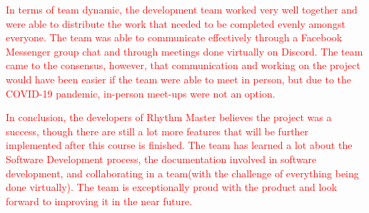 \documentclass[12pt,letterpaper]{article}
\begin{document}
\textcolor{red}{In terms of team dynamic, the development team worked very well together and were able to distribute the work that needed to be completed evenly amongst everyone. The team was able to communicate effectively through a Facebook Messenger group chat and through meetings done virtually on Discord. The team came to the consensus, however, that communication and working on the project would have been easier if the team were able to meet in person, but due to the COVID-19 pandemic, in-person meet-ups were not an option.}

\textcolor{red}{In conclusion, the developers of Rhythm Master believes the project was a success, though there are still a lot more features that will be further implemented after this course is finished. The team has learned a lot about the Software Development process, the documentation involved in software development, and collaborating in a team(with the challenge of everything being done virtually). The team is exceptionally proud with the product and look forward to improving it in the near future.}
\end{document}
